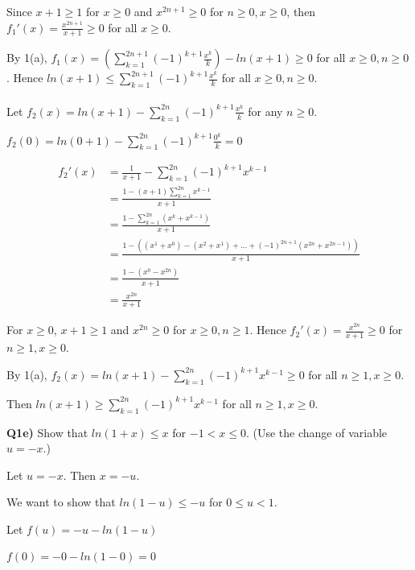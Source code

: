 \documentclass[9pt]{article}
\begin{document}
Since $x + 1 \geq 1$ for $x \geq 0$ and $x^{2n + 1} \geq 0$ for $n \geq 0, x \geq 0$, then $f_1'(x) = \frac{x^{2n + 1}}{x + 1} \geq 0$ for all $x \geq 0$.

By 1(a), $f_1(x) = (\sum\limits_{k=1}^{2n+1} (-1)^{k+1} \frac{x^k}{k}) - ln(x + 1) \geq 0$ for all $x \geq 0, n \geq 0$. Hence $ln(x + 1) \leq \sum\limits_{k=1}^{2n+1} (-1)^{k+1} \frac{x^k}{k}$ for all $x \geq 0, n \geq 0$.
\\
\\

Let $f_2(x) = ln(x + 1) - \sum\limits_{k=1}^{2n} (-1)^{k+1} \frac{x^k}{k}$ for any $n \geq 0$.

$f_2(0) = ln(0 + 1) - \sum\limits_{k=1}^{2n} (-1)^{k+1} \frac{0^k}{k} = 0$

\begin{align*}
  f_2'(x) &= \frac{1}{x + 1} - \sum\limits_{k=1}^{2n} (-1)^{k+1} x^{k-1} \\
          &= \frac{1 - (x + 1)\sum\limits_{k=1}^{2n} x^{k - 1}}{x + 1} \\
          &= \frac{1 - \sum\limits_{k=1}^{2n}(x^k + x^{k - 1})}{x + 1} \\
          &= \frac{1 - ((x^1 + x^0) - (x^2 + x^1) + ... + (-1)^{2n + 1}(x^{2n} + x^{2n - 1}))}{x + 1} \\
          &= \frac{1 - (x^0 - x^{2n})}{x + 1} \\
          &= \frac{x^{2n}}{x + 1}
\end{align*}

For $x \geq 0$, $x + 1 \geq 1$ and $x^{2n} \geq 0$ for $x \geq 0, n \geq 1$. Hence $f_2'(x) = \frac{x^{2n}}{x + 1} \geq 0$ for $n \geq 1, x \geq 0$.

By 1(a), $f_2(x) = ln(x + 1) - \sum\limits_{k=1}^{2n} (-1)^{k+1} x^{k-1} \geq 0$ for all $n \geq 1, x \geq 0$.

Then $ln(x + 1) \geq \sum\limits_{k=1}^{2n} (-1)^{k+1} x^{k-1}$ for all $n \geq 1, x \geq 0$.


\begin{tcolorbox}
  \textbf{Q1e)} Show that $ln(1 + x) \leq x$ for $-1 < x \leq 0$. (Use the change of variable $u = -x$.)
\end{tcolorbox}

Let $u = -x$. Then $x = -u$.

We want to show that $ln(1 - u) \leq -u$ for $0 \leq u < 1$.

Let $f(u) = -u - ln(1 - u)$

$f(0) = -0 - ln(1 - 0) = 0$
\end{document}
